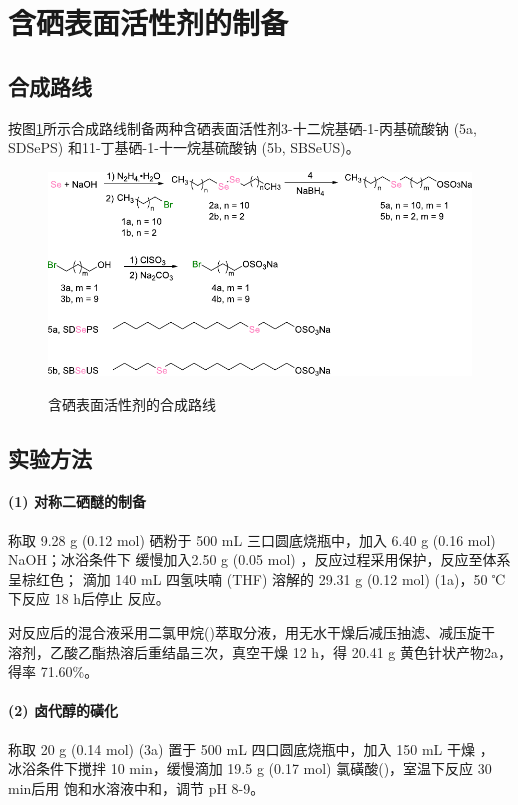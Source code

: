\documentclass[bachelor,fandolfonts,replaceperiod]{jnuthesis}
\begin{document}
    \section{含硒表面活性剂的制备}
    \subsection{合成路线}
    按图\ref{fig:scheme-synthesis}所示合成路线制备两种含硒表面活性剂3-十二烷基硒-1-丙基硫酸钠 
    (5a, SDSePS) 和11-丁基硒-1-十一烷基硫酸钠 (5b, SBSeUS)。
    \begin{figure}[htbp]
        \centering
        \includegraphics[scale=1]{figure/scheme-synthesis.pdf}\\
        \caption{含硒表面活性剂的合成路线}\label{fig:scheme-synthesis}
    \end{figure}

    \subsection{实验方法}
    \paragraph*{(1) 对称二硒醚的制备}
    称取 9.28 g (0.12 mol) 硒粉于 500 mL 三口圆底烧瓶中，加入 6.40 g (0.16 mol) NaOH；冰浴条件下
    缓慢加入2.50 g (0.05 mol) ，反应过程采用保护，反应至体系呈棕红色； 
    滴加 140 mL 四氢呋喃 (THF) 溶解的 29.31 g (0.12 mol)  (1a)，50 ℃下反应 18 h后停止
    反应。
    
    对反应后的混合液采用二氯甲烷()萃取分液，用无水干燥后减压抽滤、减压旋干
    溶剂，乙酸乙酯热溶后重结晶三次，真空干燥 12 h，得 20.41 g 黄色针状产物2a，得率 71.60\%。
    
    \paragraph*{(2) 卤代醇的磺化}
    称取 20 g (0.14 mol)  (3a) 置于 500 mL 四口圆底烧瓶中，加入 150 mL 干燥 ，
    冰浴条件下搅拌 10 min，缓慢滴加 19.5 g (0.17 mol) 氯磺酸()，室温下反应 30 min后用
    饱和水溶液中和，调节 pH 8-9。
    
\end{document}
